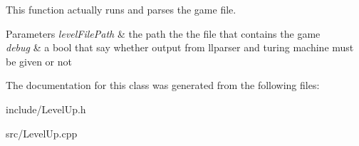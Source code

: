 This function actually runs and parses the game file. 


\begin{DoxyParams}{Parameters}
{\em level\+File\+Path} & the path the the file that contains the game \\
\hline
{\em debug} & a bool that say whether output from llparser and turing machine must be given or not \\
\hline
\end{DoxyParams}


The documentation for this class was generated from the following files\+:\begin{DoxyCompactItemize}
\item 
include/Level\+Up.\+h\item 
src/Level\+Up.\+cpp\end{DoxyCompactItemize}
